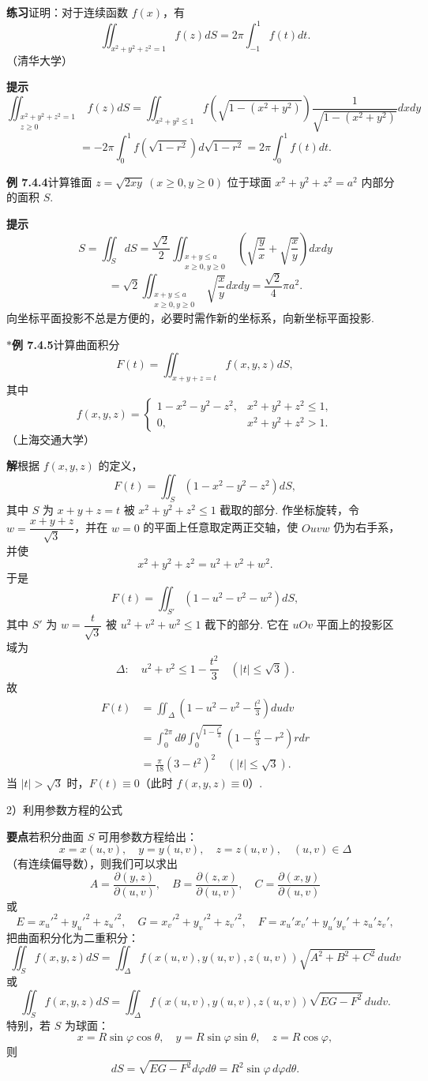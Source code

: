 \documentclass[UTF8,12pt,a4paper,fontset=fandol]{ctexart}
\begin{document}
\noindent\textbf{练习}\quad 证明：对于连续函数 $f(x)$，有
\[
\iint_{x^2+y^2+z^2=1}f(z)dS=2\pi\int_{-1}^1f(t)dt.
\]
（清华大学）

\noindent\textbf{提示}\quad
\[
\iint_{\substack{x^2+y^2+z^2=1\\ z\ge0}}f(z)dS
=\iint_{x^2+y^2\le1}
f\left(\sqrt{1-(x^2+y^2)}\right)
\frac1{\sqrt{1-(x^2+y^2)}}dxdy
\]
\[
=-2\pi\int_0^1f\left(\sqrt{1-r^2}\right)d\sqrt{1-r^2}
=2\pi\int_0^1f(t)dt.
\]

\noindent\textbf{例 7.4.4}\quad 计算锥面 $z=\sqrt{2xy}\ (x\ge0,y\ge0)$ 位于球面 $x^2+y^2+z^2=a^2$ 内部分的面积 $S$.

\noindent\textbf{提示}\quad
\[
S=\iint_SdS
=\frac{\sqrt2}{2}\iint_{\substack{x+y\le a\\x\ge0,y\ge0}}
\left(\sqrt{\frac yx}+\sqrt{\frac xy}\right)dxdy
\]
\[
=\sqrt2\iint_{\substack{x+y\le a\\x\ge0,y\ge0}}\sqrt{\frac xy}dxdy
=\frac{\sqrt2}{4}\pi a^2.
\]
向坐标平面投影不总是方便的，必要时需作新的坐标系，向新坐标平面投影.

\noindent\textbf{$*$例 7.4.5}\quad 计算曲面积分
\[
F(t)=\iint_{x+y+z=t}f(x,y,z)dS,
\]
其中
\[
f(x,y,z)=
\begin{cases}
1-x^2-y^2-z^2, & x^2+y^2+z^2\le1,\\
0, & x^2+y^2+z^2>1.
\end{cases}
\]
（上海交通大学）

\noindent\textbf{解}\quad 根据 $f(x,y,z)$ 的定义，
\[
F(t)=\iint_S(1-x^2-y^2-z^2)dS,
\]
其中 $S$ 为 $x+y+z=t$ 被 $x^2+y^2+z^2\le1$ 截取的部分. 作坐标旋转，令 $w=\dfrac{x+y+z}{\sqrt3}$，并在 $w=0$ 的平面上任意取定两正交轴，使 $Ouvw$ 仍为右手系，并使
\[
x^2+y^2+z^2=u^2+v^2+w^2.
\]
于是
\[
F(t)=\iint_{S'}\left(1-u^2-v^2-w^2\right)dS,
\]
其中 $S'$ 为 $w=\dfrac t{\sqrt3}$ 被 $u^2+v^2+w^2\le1$ 截下的部分. 它在 $uOv$ 平面上的投影区域为
\[
\Delta:\quad u^2+v^2\le1-\frac{t^2}3\quad(|t|\le\sqrt3).
\]
故
\[
\begin{aligned}
F(t)
&=\iint_\Delta\left(1-u^2-v^2-\frac{t^2}3\right)dudv\\
&=\int_0^{2\pi}d\theta\int_0^{\sqrt{1-\frac{t^2}3}}
\left(1-\frac{t^2}3-r^2\right)rdr\\
&=\frac\pi{18}(3-t^2)^2\quad(|t|\le\sqrt3).
\end{aligned}
\]
当 $|t|>\sqrt3$ 时，$F(t)\equiv0$（此时 $f(x,y,z)\equiv0$）.

2）利用参数方程的公式

\noindent\textbf{要点}\quad 若积分曲面 $S$ 可用参数方程给出：
\[
x=x(u,v),\quad y=y(u,v),\quad z=z(u,v),\quad (u,v)\in\Delta
\]
（有连续偏导数），则我们可以求出
\[
A=\frac{\partial(y,z)}{\partial(u,v)},\quad
B=\frac{\partial(z,x)}{\partial(u,v)},\quad
C=\frac{\partial(x,y)}{\partial(u,v)}
\]
或
\[
E=x_u'^2+y_u'^2+z_u'^2,\quad
G=x_v'^2+y_v'^2+z_v'^2,\quad
F=x_u'x_v'+y_u'y_v'+z_u'z_v',
\]
把曲面积分化为二重积分：
\[
\iint_Sf(x,y,z)dS
=\iint_\Delta f(x(u,v),y(u,v),z(u,v))
\sqrt{A^2+B^2+C^2}\,dudv
\]
或
\[
\iint_Sf(x,y,z)dS
=\iint_\Delta f(x(u,v),y(u,v),z(u,v))\sqrt{EG-F^2}\,dudv.
\]
特别，若 $S$ 为球面：
\[
x=R\sin\varphi\cos\theta,\quad
y=R\sin\varphi\sin\theta,\quad
z=R\cos\varphi,
\]
则
\[
dS=\sqrt{EG-F^2}d\varphi d\theta=R^2\sin\varphi\,d\varphi d\theta.
\]
\end{document}
